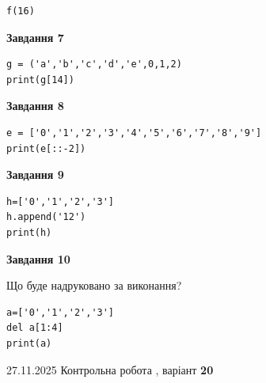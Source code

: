 \documentclass[12pt, ukrainian]{article}
\begin{document}
{{{{{{{{{{{{{{{{{{{{\begin{minipage}[t]{10.5cm}
\begin{verbatim}
f(16)
\end{verbatim}



\begin{center}
\textbf{Завдання 7}
\end{center}

\begin{verbatim}
g = ('a','b','c','d','e',0,1,2)
print(g[14])
\end{verbatim}



\begin{center}
\textbf{Завдання 8}
\end{center}

\begin{verbatim}
e = ['0','1','2','3','4','5','6','7','8','9']
print(e[::-2])
\end{verbatim}



\begin{center}
\textbf{Завдання 9}
\end{center}

\begin{verbatim}
h=['0','1','2','3']
h.append('12')
print(h)
\end{verbatim}



\begin{center}
\textbf{Завдання 10}
\end{center}
Що буде надруковано за виконання?\par
\begin{verbatim}
a=['0','1','2','3']
del a[1:4]
print(a)
\end{verbatim}

\end{minipage}

}
\newpage

{{ 27.11.2025 Контрольна робота , варіант  \No \textbf { 20 }\par}}
{

{%



}}}}}}}}}}}}}}}}}}}}}
\end{document}
